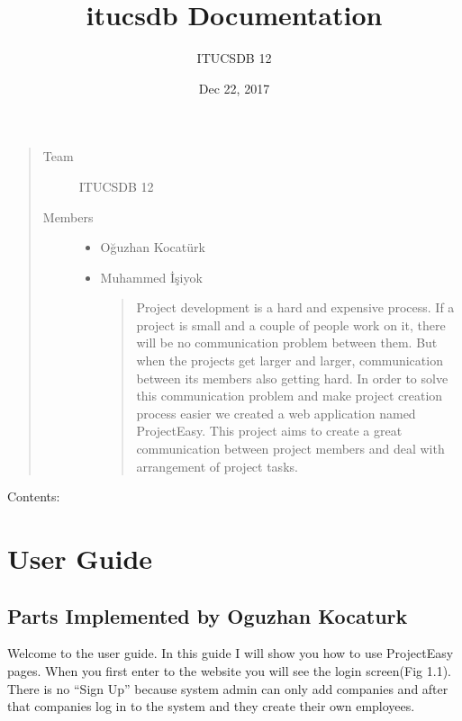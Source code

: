 \documentclass[a4paper,10pt,english]{sphinxmanual}
\title{itucsdb Documentation}
\date{Dec 22, 2017}
\author{ITUCSDB 12}
\begin{document}
\maketitle
\sphinxtableofcontents
{}\label{\detokenize{index::doc}}

\begin{quote}\begin{description}
\item[{Team}] \leavevmode
ITUCSDB 12

\item[{Members}] \leavevmode\begin{itemize}
\item {} 
Oğuzhan Kocatürk

\item {} 
Muhammed İşiyok
\begin{quote}

Project development is a hard and expensive process. If a project is small and a couple of people work on it, there will be no
communication problem between them. But when the projects get larger and larger, communication between its members also getting hard.
In order to solve this communication problem and make project creation process easier we created a web application named ProjectEasy. This project aims
to create a great communication between project members and deal with arrangement of project tasks.
\end{quote}

\end{itemize}

\end{description}\end{quote}

Contents:


\chapter{User Guide}
\label{\detokenize{user/index:user-guide}}\label{\detokenize{user/index:welcome-to-itucsdb-s-documentation}}\label{\detokenize{user/index::doc}}

\section{Parts Implemented by Oguzhan Kocaturk}
\label{\detokenize{user/member1:parts-implemented-by-oguzhan-kocaturk}}\label{\detokenize{user/member1::doc}}
Welcome to the user guide. In this guide I will show you how to use ProjectEasy pages. When you first enter to the website
you will see the login screen(Fig 1.1). There is no “Sign Up” because system admin can only add companies and after that companies log in to the system
and they create their own employees.
\end{document}
